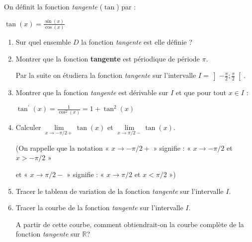 
%
On définit la fonction \textit{tangente} ($\tan$) par : 

\begin{center}
$\tan\left(x\right)=\frac{\sin\left(x\right)}{\cos\left(x\right)}$
\end{center}
\begin{enumerate}
     \item
     Sur quel ensemble $D$ la fonction \textit{tangente} est elle définie ?
     \item
     Montrer que la fonction \textbf{tangente} est périodique de période $\pi $.
\par
     Par la suite on étudiera la fonction \textit{tangente} sur l'intervalle $I=\left]-\frac{\pi }{2} ; \frac{\pi }{2}\right[$.
     \item
     Montrer que la fonction \textit{tangente} est dérivable sur $I$ et que pour tout $x \in  I$ :
     \begin{center}$\tan^{\prime}\left(x\right)=\frac{1}{\cos^{2}\left(x\right)}=1+\tan^{2}\left(x\right)$\end{center}
     \item
     Calculer $\lim\limits_{x\rightarrow -\pi /2+}\tan\left(x\right)$ et $\lim\limits_{x\rightarrow \pi /2-}\tan\left(x\right)$.
     \par
     (On rappelle que la notation « $x\rightarrow -\pi /2+$ » signifie : « $x\rightarrow -\pi /2$ et $x > -\pi /2$ »
     \par
     et « $x\rightarrow \pi /2-$ » signifie : « $x\rightarrow \pi /2$ et $x < \pi /2$ »)
     \item
     Tracer le tableau de variation de la fonction \textit{tangente} sur l'intervalle $I$.
     \item
     Tracer la courbe de la fonction \textit{tangente} sur l'intervalle $I$.
     \par
     A partir de cette courbe, comment obtiendrait-on la courbe complète de la fonction \textit{tangente} sur $\mathbb{R}$?
\end{enumerate}
\begin{corrige}

\end{corrige}

